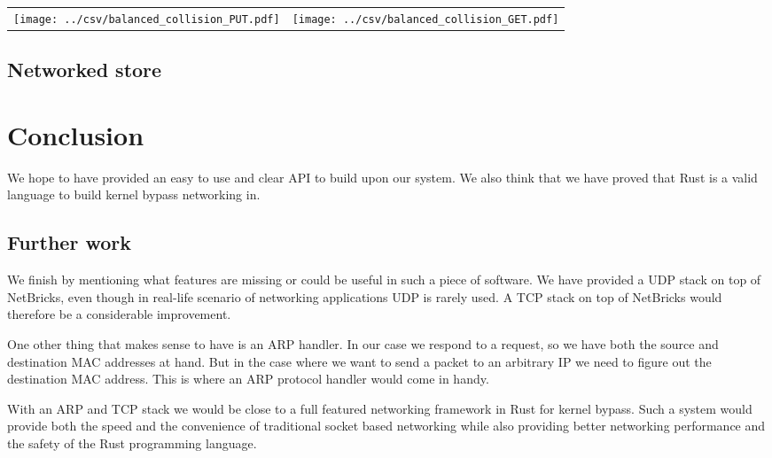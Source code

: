 \documentclass[11pt]{book}
\begin{document}
\begin{center}
  \begin{tabular}{c c} \label{table:col-balanced}
    \texttt{[image: ../csv/balanced\_collision\_PUT.pdf]}
    &
      \texttt{[image: ../csv/balanced\_collision\_GET.pdf]}
  \end{tabular}
\end{center}

\subsection{Networked store}


\section{Conclusion}

We hope to have provided an easy to use and clear API to build upon
our system. We also think that we have proved that Rust is a valid
language to build kernel bypass networking in.

\subsection{Further work}

We finish by mentioning what features are missing or could be useful
in such a piece of software. We have provided a UDP stack on top of
NetBricks, even though in real-life scenario of networking
applications UDP is rarely used. A TCP stack on top of NetBricks would
therefore be a considerable improvement.

One other thing that makes sense to have is an ARP handler. In our
case we respond to a request, so we have both the source and
destination MAC addresses at hand. But in the case where we want to
send a packet to an arbitrary IP we need to figure out the destination
MAC address. This is where an ARP protocol handler would come in
handy. 

With an ARP and TCP stack we would be close to a full featured
networking framework in Rust for kernel bypass. Such a system would
provide both the speed and the convenience of traditional socket based
networking while also providing better networking performance and the
safety of the Rust programming language. 



\newpage
{}

{}
\end{document}
